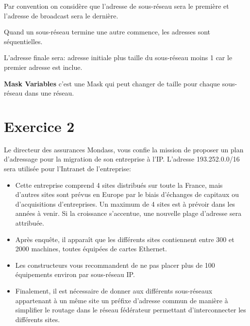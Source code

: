 \documentclass{article}
\begin{document}
\begin{resolution}
    \begin{remark}
        Par convention on considère que l'adresse de sous-réseau sera le première et l'adresse de broadcast sera le dernière. 
    \end{remark}
    \begin{remark}
        Quand un sous-réseau termine une autre commence, les adresses sont séquentielles. 
    \end{remark}
    \begin{remark}
        L'adresse finale sera: adresse initiale plus taille du sous-réseau moins 1 car le premier adresse est inclue.
    \end{remark}


    \begin{definition}
        \textbf{Mask Variables} c'est une Mask qui peut changer de taille pour chaque sous-réseau dans une réseau.
    \end{definition}
\end{resolution}

\section*{Exercice 2}
Le directeur des assurances Mondass, vous confie la mission de proposer un plan d'adressage pour la migration de son entreprise à l'IP. L'adresse 193.252.0.0/16 sera utilisée pour l'Intranet de l'entreprise:
\begin{itemize}
    \item Cette entreprise comprend 4 sites distribués sur toute la France, mais d'autres sites sont prévus en Europe par le biais d'échanges de capitaux ou d'acquisitions d'entreprises.  Un maximum de 4 sites est à prévoir dans les années à venir. Si la croissance s'accentue, une nouvelle plage d'adresse sera attribuée.
    \item Après enquête, il apparaît que les différents sites contiennent entre 300 et 2000 machines, toutes équipées de cartes Ethernet.
    \item Les constructeurs vous recommandent de ne pas placer plus de 100 équipements environ par sous-réseau IP.
    \item Finalement, il est nécessaire de donner aux différents sous-réseaux appartenant à un même site un préfixe d'adresse commun de manière à simplifier le routage dans le réseau fédérateur permettant d'interconnecter les différents sites.
\end{itemize}
\end{document}
